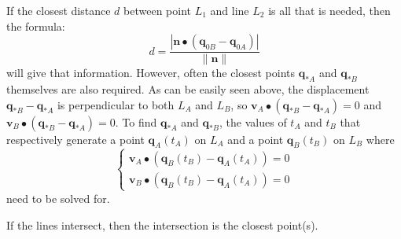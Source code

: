 \documentclass{article}
\begin{document}
If the closest distance \(d\) between point \(L_1\) and line \(L_2\) is all that is needed, then the formula:
\[d = \frac{|\mathbf{n} \bullet (\mathbf{q}_{0B} - \mathbf{q}_{0A})|}{\|\mathbf{n}\|}\]
will give that information. However, often the closest points \(\mathbf{q}_{*A}\) and \(\mathbf{q}_{*B}\) themselves are also required. As can be easily seen above, the displacement \(\mathbf{q}_{*B} - \mathbf{q}_{*A}\) is perpendicular to both \(L_A\) and \(L_B\), so \(\mathbf{v}_A \bullet (\mathbf{q}_{*B} - \mathbf{q}_{*A}) = 0\) and \(\mathbf{v}_B \bullet (\mathbf{q}_{*B} - \mathbf{q}_{*A}) = 0\). To find \(\mathbf{q}_{*A}\) and \(\mathbf{q}_{*B}\), the values of \(t_A\) and \(t_B\) that respectively generate a point \(\mathbf{q}_A(t_A)\) on \(L_A\) and a point \(\mathbf{q}_B(t_B)\) on \(L_B\) where 
\[\left\{\begin{array}{c}
\mathbf{v}_A \bullet (\mathbf{q}_B(t_B) - \mathbf{q}_A(t_A)) = 0 \\
\mathbf{v}_B \bullet (\mathbf{q}_B(t_B) - \mathbf{q}_A(t_A)) = 0
\end{array}\right.\] 
need to be solved for.

If the lines intersect, then the intersection is the closest point(s). 
\end{document}
